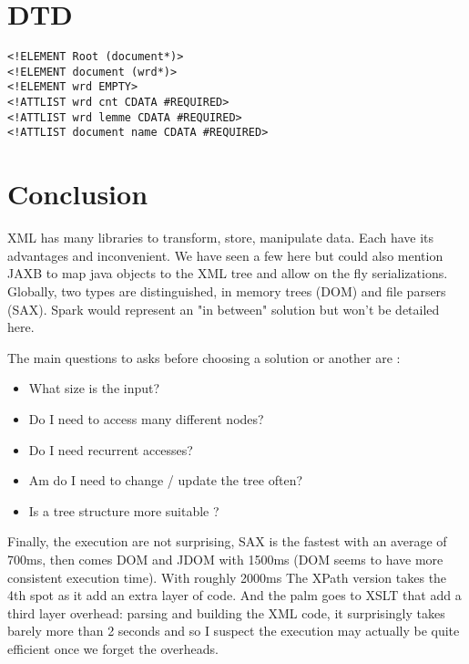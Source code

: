 \documentclass{article}
\begin{document}
\section*{DTD}

\begin{verbatim}
<!ELEMENT Root (document*)>
<!ELEMENT document (wrd*)>
<!ELEMENT wrd EMPTY>
<!ATTLIST wrd cnt CDATA #REQUIRED>
<!ATTLIST wrd lemme CDATA #REQUIRED>
<!ATTLIST document name CDATA #REQUIRED>
\end{verbatim}


\section*{Conclusion}
XML has many libraries to transform, store, manipulate data. Each have its advantages and inconvenient. We have seen a few here but could also mention JAXB to map java objects to the XML tree and allow on the fly serializations. Globally, two types are distinguished, in memory trees (DOM) and file parsers (SAX). Spark would represent an "in between" solution but won't be detailed here. 

The main questions to asks before choosing a solution or another are : 
\begin{itemize}
    \item What size is the input?
    \item Do I need to access many different nodes?
    \item Do I need recurrent accesses?
    \item Am do I need to change / update the tree often?
    \item Is a tree structure more suitable ? 
\end{itemize}

Finally, the execution are not surprising, SAX is the fastest with an average of 700ms, then comes DOM and JDOM with 1500ms (DOM seems to have more consistent execution time). With roughly 2000ms The XPath version takes the 4th spot as it add an extra layer of code. And the palm goes to XSLT that add a third layer overhead: parsing and building the XML code, it surprisingly takes barely more than 2 seconds and so I suspect the execution may actually be quite efficient once we forget the overheads.
\end{document}
